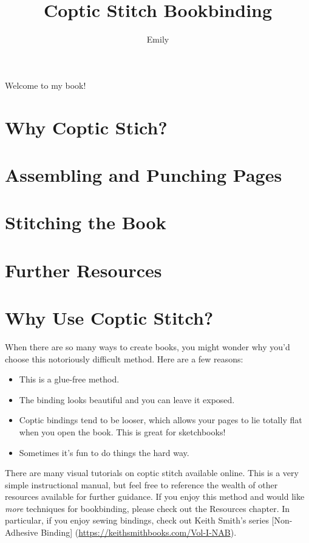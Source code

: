 \documentclass[
  openany]{book}
\title{Coptic Stitch Bookbinding}
\author{Emily}
\date{}
\providecommand{\tightlist}{%
  \setlength{\itemsep}{0pt}\setlength{\parskip}{0pt}}
\begin{document}
\maketitle

{
\setcounter{tocdepth}{1}
\tableofcontents
}
Welcome to my book!

\chapter{Why Coptic Stich?}\label{why-coptic-stich}

\chapter{Assembling and Punching Pages}\label{assembling-and-punching-pages}

\chapter{Stitching the Book}\label{stitching-the-book}

\chapter{Further Resources}\label{further-resources}

\chapter{Why Use Coptic Stitch?}\label{why-use-coptic-stitch}

When there are so many ways to create books, you might wonder why you'd choose this notoriously difficult method. Here are a few reasons:

\begin{itemize}
\tightlist
\item
  This is a glue-free method.
\item
  The binding looks beautiful and you can leave it exposed.
\item
  Coptic bindings tend to be looser, which allows your pages to lie totally flat when you open the book. This is great for sketchbooks!
\item
  Sometimes it's fun to do things the hard way.
\end{itemize}

There are many visual tutorials on coptic stitch available online.
This is a very simple instructional manual, but feel free to reference the wealth of other resources available for further guidance.
If you enjoy this method and would like \emph{more} techniques for bookbinding, please check out the Resources chapter.
In particular, if you enjoy sewing bindings, check out Keith Smith's series {[}Non-Adhesive Binding{]} (\url{https://keithsmithbooks.com/Vol-I-NAB}).
\end{document}
